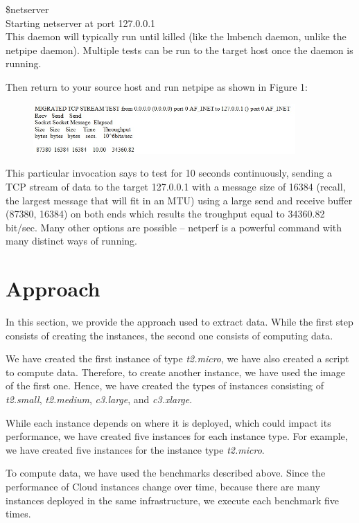 \documentclass[10pt, conference]{IEEEtran}
\begin{document}
\$netserver\\
\indent Starting netserver at port 127.0.0.1\\

This daemon will typically run until killed (like the lmbench daemon, unlike the netpipe daemon). Multiple tests can be run to the target host once the daemon is running.

Then return to your source host and run netpipe as shown in Figure 1:
\begin{figure}[h!]
	\centering
	\includegraphics[width=10cm]{figure4.jpg}
\end{figure} 

This particular invocation says to test for 10 seconds continuously, sending a TCP stream of data to the target 127.0.0.1 with a message size of 16384 (recall, the largest message that will fit in an MTU) using a large send and receive buffer (87380, 16384) on both ends which results the troughput equal to 34360.82 bit/sec. Many other options are possible -- netperf is a powerful command with many distinct ways of running. 



\section{Approach}
\label{sec:approach}

In this section, we provide the approach used to extract data. While the first step consists of creating the instances, the second one consists of computing data. 

We have created the first instance of type \textit{t2.micro}, we have also created a script to compute data. Therefore, to create another instance, we have used the image of the first one. Hence, we have created the types of instances consisting of \textit{t2.small}, \textit{t2.medium}, \textit{c3.large}, and \textit{c3.xlarge}.

While each instance depends on where it is deployed, which could impact its performance, we have created five instances for each instance type. For example, we have created five instances for the instance type \textit{t2.micro}.


To compute data, we have used the benchmarks described above. Since the performance of Cloud instances change over time, because there are many instances deployed in the same infrastructure, we execute each benchmark five times.
\end{document}
